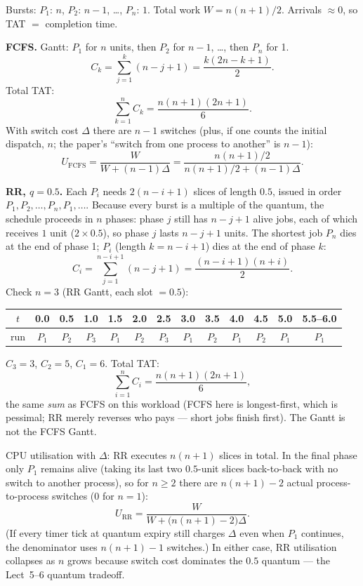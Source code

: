 \documentclass[11pt,a4paper]{article}
\newenvironment{Sol}{%
  \begin{tcolorbox}[sboxstyle, title={Solution}]%
}{%
  \end{tcolorbox}\vspace{0.35em}%
}
\begin{document}
\begin{Sol}
Bursts: $P_1{:}\,n$, $P_2{:}\,n-1$, \ldots, $P_n{:}\,1$. Total work $W = n(n+1)/2$. Arrivals $\approx 0$, so TAT $=$ completion time.

\textbf{FCFS.} Gantt: $P_1$ for $n$ units, then $P_2$ for $n-1$, \ldots, then $P_n$ for 1.
\[
C_k = \sum_{j=1}^{k}(n-j+1) = \frac{k(2n-k+1)}{2}.
\]
Total TAT:
\[
\sum_{k=1}^{n} C_k = \frac{n(n+1)(2n+1)}{6}.
\]
With switch cost $\Delta$ there are $n-1$ switches (plus, if one counts the initial dispatch, $n$; the paper's ``switch from one process to another'' is $n-1$):
\[
U_{\mathrm{FCFS}} = \frac{W}{W+(n-1)\Delta} = \frac{n(n+1)/2}{n(n+1)/2 + (n-1)\Delta}.
\]

\textbf{RR, $q=0.5$.} Each $P_i$ needs $2(n-i+1)$ slices of length $0.5$, issued in order $P_1,P_2,\ldots,P_n,P_1,\ldots$. Because every burst is a multiple of the quantum, the schedule proceeds in $n$ phases: phase $j$ still has $n-j+1$ alive jobs, each of which receives $1$ unit ($2\times 0.5$), so phase $j$ lasts $n-j+1$ units. The shortest job $P_n$ dies at the end of phase 1; $P_i$ (length $k=n-i+1$) dies at the end of phase $k$:
\[
C_i = \sum_{j=1}^{n-i+1}(n-j+1) = \frac{(n-i+1)(n+i)}{2}.
\]
Check $n=3$ (RR Gantt, each slot $=0.5$):
\begin{center}
\footnotesize
\begin{tabular}{c|cccccccccccc}
$t$ & 0.0 & 0.5 & 1.0 & 1.5 & 2.0 & 2.5 & 3.0 & 3.5 & 4.0 & 4.5 & 5.0 & 5.5--6.0 \\
\hline
run & $P_1$ & $P_2$ & $P_3$ & $P_1$ & $P_2$ & $P_3$ & $P_1$ & $P_2$ & $P_1$ & $P_2$ & $P_1$ & $P_1$ \\
\end{tabular}
\end{center}
$C_3=3$, $C_2=5$, $C_1=6$. Total TAT:
\[
\sum_{i=1}^{n} C_i = \frac{n(n+1)(2n+1)}{6},
\]
the same \emph{sum} as FCFS on this workload (FCFS here is longest-first, which is pessimal; RR merely reverses who pays --- short jobs finish first). The Gantt is not the FCFS Gantt.

CPU utilisation with $\Delta$: RR executes $n(n+1)$ slices in total. In the final phase only $P_1$ remains alive (taking its last two $0.5$-unit slices back-to-back with no switch to another process), so for $n\ge 2$ there are $n(n+1)-2$ actual process-to-process switches (0 for $n=1$):
\[
U_{\mathrm{RR}} = \frac{W}{W + \bigl(n(n+1)-2\bigr)\Delta}.
\]
(If every timer tick at quantum expiry still charges $\Delta$ even when $P_1$ continues, the denominator uses $n(n+1)-1$ switches.) In either case, RR utilisation collapses as $n$ grows because switch cost dominates the $0.5$ quantum --- the Lect~5--6 quantum tradeoff.
\end{Sol}
\end{document}

